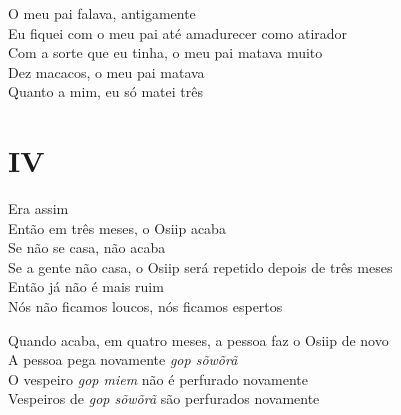 \begin{linenumbers}\begingroup\raggedright
 
\noindent O meu pai falava, antigamente\\
 Eu fiquei com o meu pai até amadurecer como atirador\\
 Com a sorte que eu tinha, o meu pai matava muito\\
 Dez macacos, o meu pai matava\\
 Quanto a mim, eu só matei três
 
 
 \medskip
\section{IV}

 \noindent Era assim\\
 Então em três meses, o Osiip acaba\\
 Se não se casa, não acaba\\
 Se a gente não casa, o Osiip será repetido depois de três meses\\
 Então já não é mais ruim\\
 Nós não ficamos loucos, nós ficamos espertos
 
\end{linenumbers}\endgroup

\bigskip

\begin{linenumbers}\begingroup\raggedright
 
\noindent  Quando acaba, em quatro meses, a pessoa faz o Osiip de novo\\
 A pessoa pega novamente \textit{gop sõwõrã}\\
 O vespeiro \textit{gop miem} não é perfurado novamente\\
 Vespeiros de \textit{gop sõwõrã} são perfurados novamente
 
\end{linenumbers}\endgroup

